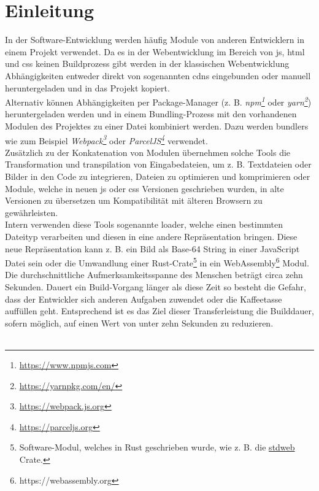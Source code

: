 \documentclass[11pt]{report}
\begin{document}
    \chapter{Einleitung}
    	In der Software-Entwicklung werden häufig Module von anderen Entwicklern in einem Projekt verwendet. Da es in der Webentwicklung im Bereich von \Gls{js}, \Gls{html} und \Gls{css} keinen Buildprozess gibt werden in der klassischen Webentwicklung Abhängigkeiten entweder direkt von sogenannten \Glspl{cdn} eingebunden oder manuell heruntergeladen und in das Projekt kopiert.\\
		Alternativ können Abhängigkeiten per Package-Manager (z. B. \emph{npm\footnote{\url{https://www.npmjs.com}}} oder \emph{yarn\footnote{\url{https://yarnpkg.com/en/}}}) heruntergeladen werden und in einem Bundling-Prozess mit den vorhandenen Modulen des Projektes zu einer Datei kombiniert werden. Dazu werden \Glspl{bundler} wie zum Beispiel \emph{Webpack\footnote{\url{https://webpack.js.org}}} oder \emph{ParcelJS\footnote{\url{https://parceljs.org}}} verwendet.\\
		Zusätzlich zu der Konkatenation von Modulen übernehmen solche Tools die Transformation und \Gls{transpilation} von Eingabedateien, um z. B. Textdateien oder Bilder in den Code zu integrieren, Dateien zu optimieren und komprimieren oder Module, welche in neuen \Gls{js} oder \Gls{css} Versionen geschrieben wurden, in alte Versionen zu übersetzen um Kompatibilität mit älteren Browsern zu gewährleisten.\\
		Intern verwenden diese Tools sogenannte \Gls{loader}, welche einen bestimmten Dateityp verarbeiten und diesen in eine andere Repräsentation bringen. Diese neue Repräsentation kann z. B. ein Bild als Base-64 String in einer JavaScript Datei sein oder die Umwandlung einer Rust-Crate\footnote{Software-Modul, welches in Rust geschrieben wurde, wie z. B. die \href{https://crates.io/crates/stdweb}{stdweb} Crate.} in ein WebAssembly\footnote{https://webassembly.org} Modul.\\
		Die durchschnittliche Aufmerksamkeitsspanne des Menschen beträgt circa zehn Sekunden. Dauert ein Build-Vorgang länger als diese Zeit so besteht die Gefahr, dass der Entwickler sich anderen Aufgaben zuwendet oder die Kaffeetasse auffüllen geht. Entsprechend ist es das Ziel dieser Transferleistung die Builddauer, sofern möglich, auf einen Wert von unter zehn Sekunden zu reduzieren.\\
		\\
\end{document}

